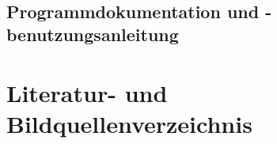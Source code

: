 \documentclass[reducespace,stylepage,semiarbeit]{spezidoc}
\begin{document}
\begin{subequations}
\begin{align}
\end{align}
\end{subequations}


\subsection{Programmdokumentation und -benutzungsanleitung}

\newpage
\section{Literatur- und Bildquellenverzeichnis}



\eidesstattlicheerklaerung
\end{document}
